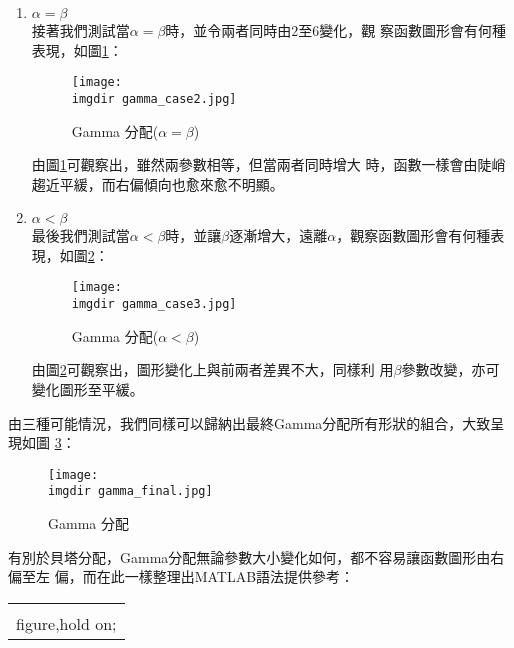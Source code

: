 \begin{enumerate}
{\begin{enumerate}
{\begin{figure}[H]
							\end{figure}
							由圖\ref{gamma_case1}可觀察出，當控制陡峭程度的形狀參數$\alpha								$愈大於尺度參數$\beta$時，圖形和理論相同，愈為陡峭，而當$\beta$愈								接近$\alpha$時，圖形則欲趨近平緩。
						}
						\item {$\alpha = \beta$\\
							接著我們測試當$\alpha = \beta$時，並令兩者同時由$2$至$6$變化，觀								察函數圖形會有何種表現，如圖\ref{gamma_case2}：
							\begin{figure}[H]	
		 		 				\centering	 			 	 
   				 				\texttt{[image: \\imgdir 												gamma\_case2.jpg]} 
   			 					\caption{Gamma 分配($\alpha = \beta$)}   		
   			 					\label{gamma_case2}   			 		 
							\end{figure}
							由圖\ref{gamma_case2}可觀察出，雖然兩參數相等，但當兩者同時增大								時，函數一樣會由陡峭趨近平緩，而右偏傾向也愈來愈不明顯。
						}
						\item {$\alpha < \beta$\\
							最後我們測試當$\alpha < \beta$時，並讓$\beta$逐漸增大，遠離$									\alpha$，觀察函數圖形會有何種表現，如圖\ref{gamma_case3}：
							\begin{figure}[H]	
		 		 				\centering	 			 	 
   				 				\texttt{[image: \\imgdir 												gamma\_case3.jpg]} 
   			 					\caption{Gamma 分配($\alpha < \beta$)}   		
   			 					\label{gamma_case3}   			 		 
							\end{figure}
							由圖\ref{gamma_case3}可觀察出，圖形變化上與前兩者差異不大，同樣利								用$\beta$參數改變，亦可變化圖形至平緩。
						}
					\end{enumerate}
					由三種可能情況，我們同樣可以歸納出最終Gamma分配所有形狀的組合，大致呈現如圖						\ref{gamma_final}：
					\begin{figure}[H]	
		 		 		\centering	 			 	 
   				 		\texttt{[image: \\imgdir 												gamma\_final.jpg]} 
   			 			\caption{Gamma 分配}   		
   			 			\label{gamma_final}   			 		 
					\end{figure}
					有別於貝塔分配，Gamma分配無論參數大小變化如何，都不容易讓函數圖形由右偏至左						偏，而在此一樣整理出MATLAB語法提供參考：
					\begin{center}\colorbox{slight}{
						\begin{tabular}{p{}}
							\MJHmarker{\textbf{\color{darkblue}{MATLAB語法 :}}}\\		
							figure,hold on; \\

\end{tabular}}
\end{center}}
\end{enumerate}
